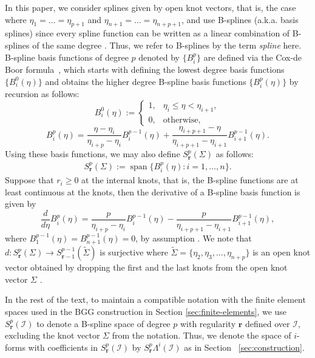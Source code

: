 \documentclass[final]{amsart}%
\newcommand{\0}{\mathaccent23}
\newcommand\spn{\operatorname{span}}
\newcommand{\br}{\mathbf r}
\begin{document}
In this paper, we consider splines given by open knot vectors, that is, the case where   $\eta_1=\dots=\eta_{p+1}$ and $\eta_{n+1}=\dots=\eta_{n+p+1}$, and use B-splines (a.k.a. basis splines) since every spline function can be written as a linear combination of B-splines of the same degree \cite{bsplines}. Thus, we refer to B-splines by the term \textit{spline} here.\\
B-spline basis functions of degree $p$ denoted by $\{B_i^p\}$ are defined via the Cox-de Boor formula~\cite{deboor}, which starts with defining the lowest degree basis functions $\{B_i^0(\eta)\}$ and obtains the higher degree B-spline basis functions $\{B_i^p(\eta)\}$ by recursion as follows:
$$
B_i^0(\eta):=
    \left\{\begin{array}{ll}
      1, & \eta_i\le \eta < \eta_{i+1}, \\
      0, & \textrm{otherwise},
    \end{array}\right.
$$
$$
B_i^p(\eta)=\frac{\eta- \eta_i}{\eta_{i+p}-\eta_i} B_i^{p-1}(\eta)+\frac{\eta_{i+p+1}-\eta}{\eta_{i+p+1}-\eta_{i+1}} B_{i+1}^{p-1}(\eta).
$$
Using these basis functions, we may also define $S^p_{\br}(\Sigma)$ as follows:
\begin{align}
S^p_{\br}(\Sigma):=\spn\{ B_i^p(\eta): i=1,\dots,n\}.
\end{align}
Suppose that $r_i\ge 0$ at the internal knots, that is, the B-spline functions are at least continuous at the knots, then the derivative of a B-spline basis function is given by
$$\frac{d}{d\eta}B_{i}^p(\eta)=\frac{p}{\eta_{i+p}-\eta_i} B_{i}^{p-1}(\eta)-\frac{p}{\eta_{i+p+1}-\eta_{i+1}}B_{i+1}^{p-1}(\eta),$$
where $B_{1}^{p-1}(\eta)=B_{n+1}^{p-1}(\eta)=0$, by assumption \cite{veig2014var}. We note that $d:S_{\br}^p(\Sigma)\to S^{p-1}_{\br-1}(\tilde{\Sigma})$ is surjective where $\tilde{\Sigma}=\{\eta_2,\eta_3,\dots, \eta_{n+p}\}$ is an open knot vector obtained by dropping the first and the last knots from the open knot vector $\Sigma$ \cite{veig2014var}.

In the rest of the text, to maintain a compatible notation with the finite element spaces used in the BGG construction in Section \ref{sec:finite-elements}, we use $S^p_{\br}(\mathcal{I})$ to denote a B-spline space of degree $p$ with regularity $\br$ defined over $\mathcal{I}$, excluding the knot vector $\Sigma$ from the notation. Thus, we 
denote the space of $i$-forms with coefficients in $S^p_{\br}(\mathcal{I})$ by $S^p_{\br}\Lambda^i(\mathcal{I})$ as in Section ~\ref{sec:construction}.
\end{document}
